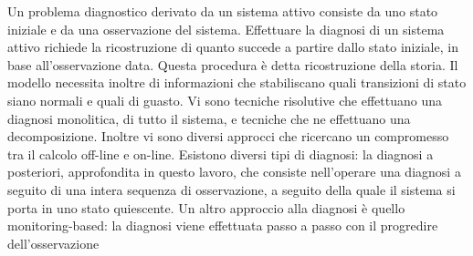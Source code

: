 Un problema diagnostico derivato da un sistema attivo consiste da uno stato iniziale e da una osservazione del sistema. Effettuare la diagnosi di un sistema attivo richiede la ricostruzione di quanto succede a partire dallo stato iniziale, in base all'osservazione data. Questa procedura è detta ricostruzione della storia. Il modello necessita inoltre di informazioni che stabiliscano quali transizioni di stato siano normali e quali di guasto.
Vi sono tecniche risolutive che effettuano una diagnosi monolitica, di tutto il sistema, e tecniche che ne effettuano una decomposizione. Inoltre vi sono diversi approcci che ricercano un compromesso tra il calcolo off-line e on-line. 
Esistono diversi tipi di diagnosi: la diagnosi a posteriori, approfondita in questo lavoro, che consiste nell'operare una diagnosi a seguito di una intera sequenza di osservazione, a seguito della quale il sistema si porta in uno stato quiescente. Un altro approccio alla diagnosi è quello monitoring-based: la diagnosi viene effettuata passo a passo con il progredire dell'osservazione